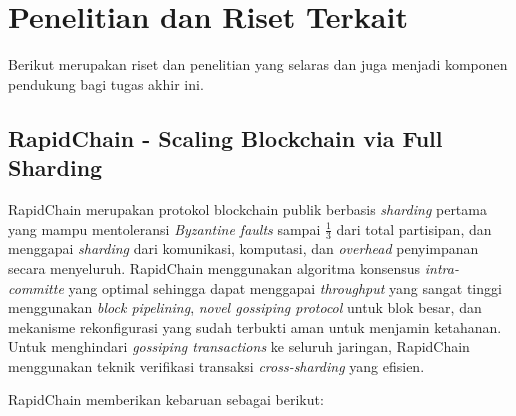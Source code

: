 \section{Penelitian dan Riset Terkait}
\label{sec:penelitian-riset-terkait}

Berikut merupakan riset dan penelitian yang selaras dan juga menjadi komponen pendukung bagi tugas akhir ini.

\subsection{RapidChain - Scaling Blockchain via Full Sharding}
\label{subsec:rapidchain}

RapidChain merupakan protokol blockchain publik berbasis \textit{sharding} pertama yang mampu mentoleransi \textit{Byzantine faults} sampai $\frac{1}{3}$ dari total partisipan, dan menggapai \textit{sharding} dari komunikasi, komputasi, dan \textit{overhead} penyimpanan secara menyeluruh. RapidChain menggunakan algoritma konsensus \textit{intra-committe} yang optimal sehingga dapat menggapai \textit{throughput} yang sangat tinggi menggunakan \textit{block pipelining}, \textit{novel gossiping protocol} untuk blok besar, dan mekanisme rekonfigurasi yang sudah terbukti aman untuk menjamin ketahanan. Untuk menghindari \textit{gossiping transactions} ke seluruh jaringan, RapidChain menggunakan teknik verifikasi transaksi \textit{cross-sharding} yang efisien.

RapidChain memberikan kebaruan sebagai berikut:

